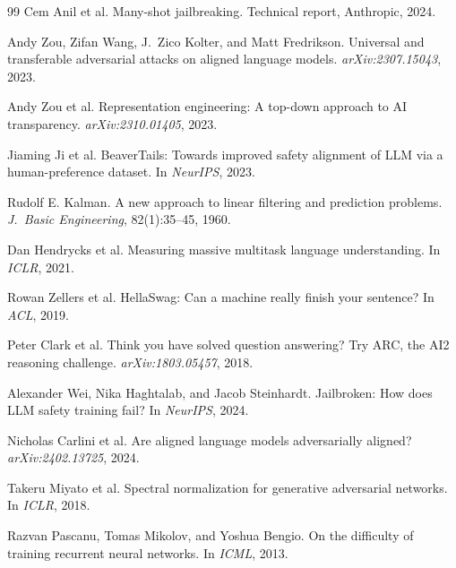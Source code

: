 \documentclass{article}
\begin{document}
\begin{thebibliography}{99}
Cem Anil et al.
Many-shot jailbreaking.
Technical report, Anthropic, 2024.

Andy Zou, Zifan Wang, J.~Zico Kolter, and Matt Fredrikson.
Universal and transferable adversarial attacks on aligned language models.
\emph{arXiv:2307.15043}, 2023.

Andy Zou et al.
Representation engineering: A top-down approach to AI transparency.
\emph{arXiv:2310.01405}, 2023.

Jiaming Ji et al.
BeaverTails: Towards improved safety alignment of LLM via a human-preference dataset.
In \emph{NeurIPS}, 2023.

%
%

Rudolf E. Kalman.
A new approach to linear filtering and prediction problems.
\emph{J.~Basic Engineering}, 82(1):35--45, 1960.

Dan Hendrycks et al.
Measuring massive multitask language understanding.
In \emph{ICLR}, 2021.

Rowan Zellers et al.
HellaSwag: Can a machine really finish your sentence?
In \emph{ACL}, 2019.

Peter Clark et al.
Think you have solved question answering? Try ARC, the AI2 reasoning challenge.
\emph{arXiv:1803.05457}, 2018.

Alexander Wei, Nika Haghtalab, and Jacob Steinhardt.
Jailbroken: How does LLM safety training fail?
In \emph{NeurIPS}, 2024.

Nicholas Carlini et al.
Are aligned language models adversarially aligned?
\emph{arXiv:2402.13725}, 2024.

Takeru Miyato et al.
Spectral normalization for generative adversarial networks.
In \emph{ICLR}, 2018.

Razvan Pascanu, Tomas Mikolov, and Yoshua Bengio.
On the difficulty of training recurrent neural networks.
In \emph{ICML}, 2013.


\end{thebibliography}
\end{document}
